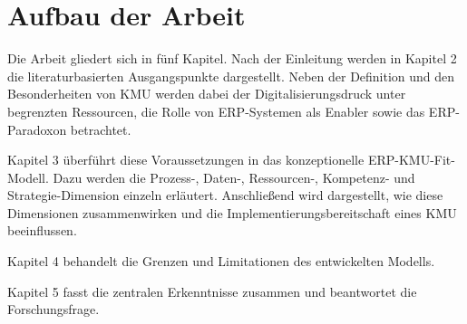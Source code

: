 \section{Aufbau der Arbeit}

Die Arbeit gliedert sich in fünf Kapitel. Nach der Einleitung werden in Kapitel 2 die literaturbasierten Ausgangspunkte dargestellt. 
Neben der Definition und den Besonderheiten von KMU werden dabei der Digitalisierungsdruck unter begrenzten Ressourcen, die 
Rolle von ERP-Systemen als Enabler sowie das ERP-Paradoxon betrachtet. 

Kapitel 3 überführt diese Voraussetzungen in das konzeptionelle ERP-KMU-Fit-Modell. Dazu werden die Prozess-, Daten-, Ressourcen-, 
Kompetenz- und Strategie-Dimension einzeln erläutert. Anschließend wird dargestellt, wie diese Dimensionen zusammenwirken und die 
Implementierungsbereitschaft eines KMU beeinflussen.

Kapitel 4 behandelt die Grenzen und Limitationen des entwickelten Modells. 

Kapitel 5 fasst die zentralen Erkenntnisse zusammen und beantwortet die Forschungsfrage.